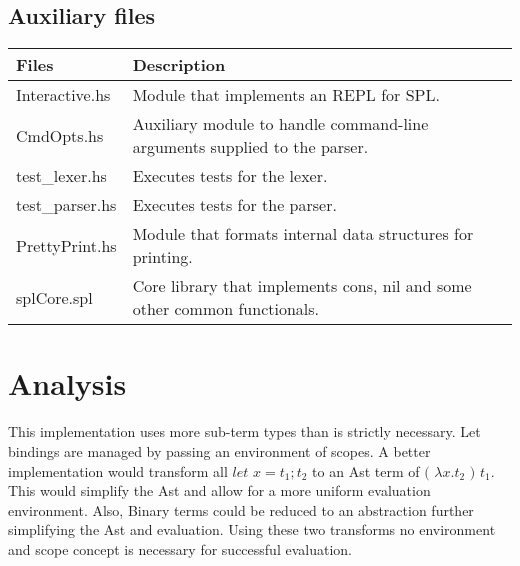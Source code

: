 \documentclass{article}
\begin{document}
\subsection{Auxiliary files}
\begin{tabular}{|l|l|}
  \hline
{\bf Files}&{\bf Description}\\
  \hline
Interactive.hs & Module that implements an REPL for SPL.\\
  \hline
CmdOpts.hs & Auxiliary module to handle command-line arguments supplied to the 
parser.\\
  \hline
test_lexer.hs & Executes tests for the lexer.\\
  \hline
test_parser.hs & Executes tests for the parser.\\
  \hline
PrettyPrint.hs & Module that formats internal data structures for printing.\\
  \hline
splCore.spl & Core library that implements cons, nil and some other common 
functionals.\\
  \hline
\end{tabular}

\section{Analysis}
This implementation uses more sub-term types than is strictly necessary. Let 
bindings are managed by passing an environment of scopes. A better 
implementation would transform all $let$ $x = t_1 ; t_2$ to an Ast term of 
$($ $\lambda x.t_2$ $)$ $t_1$. This would simplify the Ast and allow for a more
uniform evaluation environment. Also, Binary terms could be reduced to an
abstraction further simplifying the Ast and evaluation. Using these two 
transforms no environment and scope concept is necessary for successful 
evaluation.
\end{document}
